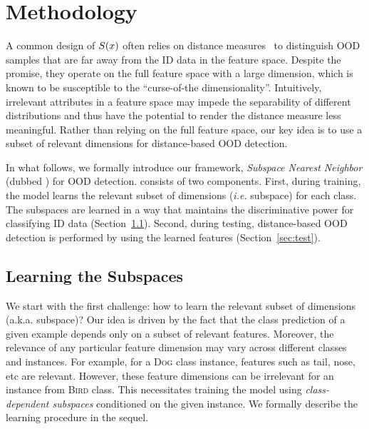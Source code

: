 

\section{Methodology}
\label{sec:method}

A common design of $S(\*x)$ often relies on distance measures~\cite{2021ssd,sun2022knn,lee2018simple} to distinguish OOD samples that are far away from the ID data in the feature space. Despite the promise, they operate on the full feature space with a large dimension, which is known to be susceptible to the ``{curse-of-the dimensionality}''. Intuitively, irrelevant attributes in a
feature space may impede the separability of different distributions and thus have the
potential to render the distance measure less meaningful. Rather than relying on the full feature space, our key idea is to use a subset of relevant dimensions for distance-based OOD detection.

In what follows, we formally introduce our framework, \emph{Subspace Nearest Neighbor} (dubbed {\name}) for OOD detection. \name consists of two components. First, during training, the model learns the relevant subset of dimensions
(\emph{i.e.} subspace) for each class. The subspaces are learned in a way that maintains the discriminative power for classifying ID data (Section~\ref{sec:train}). Second, during testing, distance-based OOD detection is performed by using the learned features (Section~\ref{sec:test}).  

\subsection{Learning the Subspaces}
\label{sec:train}

We start with the first challenge: {how to learn the relevant subset of dimensions (a.k.a. subspace)?} Our idea is driven by the fact that the class prediction of a given example depends only on a subset of relevant features. Moreover, the relevance of any particular feature dimension may vary across different classes and instances. For example, for a \textsc{Dog} class instance, features such as tail, nose, etc are relevant. However, these feature dimensions can be irrelevant for an instance from \textsc{Bird} class. This necessitates training the model using \emph{class-dependent subspaces} conditioned on the given instance. We formally describe the learning procedure in the sequel.

